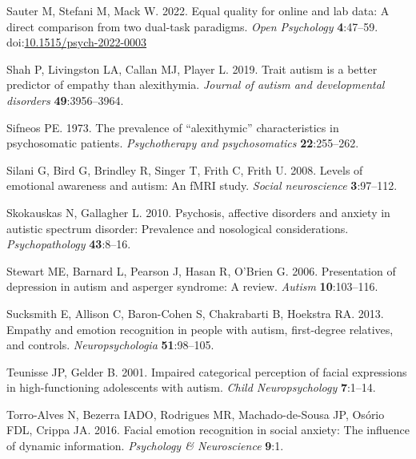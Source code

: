 \documentclass[
]{article}
\newlength{\cslhangindent}
\newlength{\cslentryspacingunit} %
\newenvironment{CSLReferences}[2] %
 {%
  \setlength{\parindent}{0pt}
  \ifodd #1
  \let\oldpar\par
  \def\par{\hangindent=\cslhangindent\oldpar}
  \fi
  \setlength{\parskip}{#2\cslentryspacingunit}
 }%
 {}
\begin{document}
\begin{CSLReferences}{1}{0}
\leavevmode{}%
Sauter M, Stefani M, Mack W. 2022. Equal quality for online and lab data: A direct comparison from two dual-task paradigms. \emph{Open Psychology} \textbf{4}:47--59. doi:\href{https://doi.org/10.1515/psych-2022-0003}{10.1515/psych-2022-0003}

\leavevmode{}%
Shah P, Livingston LA, Callan MJ, Player L. 2019. Trait autism is a better predictor of empathy than alexithymia. \emph{Journal of autism and developmental disorders} \textbf{49}:3956--3964.

\leavevmode{}%
Sifneos PE. 1973. The prevalence of {``alexithymic''} characteristics in psychosomatic patients. \emph{Psychotherapy and psychosomatics} \textbf{22}:255--262.

\leavevmode{}%
Silani G, Bird G, Brindley R, Singer T, Frith C, Frith U. 2008. Levels of emotional awareness and autism: An fMRI study. \emph{Social neuroscience} \textbf{3}:97--112.

\leavevmode{}%
Skokauskas N, Gallagher L. 2010. Psychosis, affective disorders and anxiety in autistic spectrum disorder: Prevalence and nosological considerations. \emph{Psychopathology} \textbf{43}:8--16.

\leavevmode{}%
Stewart ME, Barnard L, Pearson J, Hasan R, O'Brien G. 2006. Presentation of depression in autism and asperger syndrome: A review. \emph{Autism} \textbf{10}:103--116.

\leavevmode{}%
Sucksmith E, Allison C, Baron-Cohen S, Chakrabarti B, Hoekstra RA. 2013. Empathy and emotion recognition in people with autism, first-degree relatives, and controls. \emph{Neuropsychologia} \textbf{51}:98--105.

\leavevmode{}%
Teunisse JP, Gelder B. 2001. Impaired categorical perception of facial expressions in high-functioning adolescents with autism. \emph{Child Neuropsychology} \textbf{7}:1--14.

\leavevmode{}%
Torro-Alves N, Bezerra IADO, Rodrigues MR, Machado-de-Sousa JP, Osório FDL, Crippa JA. 2016. Facial emotion recognition in social anxiety: The influence of dynamic information. \emph{Psychology \& Neuroscience} \textbf{9}:1.


\end{CSLReferences}
\end{document}
